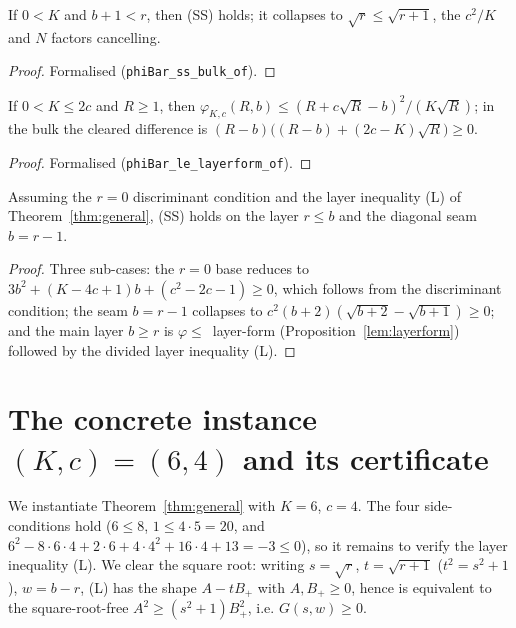\begin{proposition}[Bulk]\label{prop:ss_bulk}
\leanok
{}
If $0<K$ and $b+1<r$, then (SS) holds; it collapses to $\sqrt r\le\sqrt{r+1}$, the
$c^2/K$ and $N$ factors cancelling.
\end{proposition}
\begin{proof}\leanok Formalised (\texttt{phiBar\_ss\_bulk\_of}). \end{proof}

\begin{proposition}\label{lem:layerform}
\leanok
{}
If $0<K\le 2c$ and $R\ge1$, then $\varphi_{K,c}(R,b)\le(R+c\sqrt R-b)^2/(K\sqrt R)$;
in the bulk the cleared difference is $(R-b)\big((R-b)+(2c-K)\sqrt R\big)\ge0$.
\end{proposition}
\begin{proof}\leanok Formalised (\texttt{phiBar\_le\_layerform\_of}). \end{proof}

\begin{proposition}\label{prop:ss_hard}
\leanok
{}
Assuming the $r=0$ discriminant condition and the layer inequality (L) of
Theorem~\ref{thm:general}, (SS) holds on the layer $r\le b$ and the diagonal seam
$b=r-1$.
\end{proposition}
\begin{proof}\leanok
Three sub-cases: the $r=0$ base reduces to $3b^2+(K-4c+1)b+(c^2-2c-1)\ge0$, which
follows from the discriminant condition; the seam $b=r-1$ collapses to
$c^2(b+2)(\sqrt{b+2}-\sqrt{b+1})\ge0$; and the main layer $b\ge r$ is
$\varphi\le$~layer-form (Proposition~\ref{lem:layerform}) followed by the divided
layer inequality (L).
\end{proof}

\section{The concrete instance $(K,c)=(6,4)$ and its certificate}
\label{sec:instance}

We instantiate Theorem~\ref{thm:general} with $K=6$, $c=4$. The four side-conditions
hold ($6\le8$, $1\le4\cdot5=20$, and $6^2-8\cdot6\cdot4+2\cdot6+4\cdot4^2+16\cdot4+13=-3\le0$),
so it remains to verify the layer inequality (L). We clear the square root: writing
$s=\sqrt r$, $t=\sqrt{r+1}$ ($t^2=s^2+1$), $w=b-r$, (L) has the shape $A-tB_{+}$ with
$A,B_{+}\ge0$, hence is equivalent to the square-root-free $A^2\ge(s^2+1)B_{+}^2$,
i.e. $G(s,w)\ge0$.

